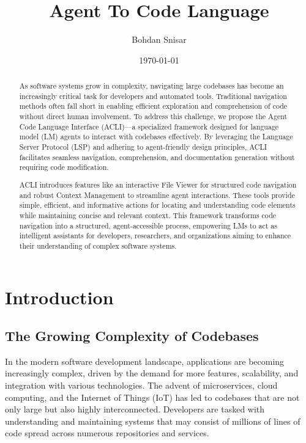 \documentclass[12pt,oneside]{article}
\date{\small\today}
\title{%
  Agent To Code Language \\
  \colorbox{mypink}{\small\sffamily\color{white}{White Paper}}}
\author{Bohdan Snisar} %
\begin{document}
\raggedbottom

\maketitle
\begin{abstract}
  As software systems grow in complexity, navigating large codebases has become an increasingly critical task for 
  developers and automated tools. Traditional navigation methods often fall short in enabling efficient exploration 
  and comprehension of code without direct human involvement. To address this challenge, we propose 
  the Agent Code Language Interface (ACLI)—a specialized framework designed for 
  language model (LM) agents to interact with codebases effectively. By leveraging the 
  Language Server Protocol (LSP) and adhering to agent-friendly design principles, ACLI facilitates seamless 
  navigation, comprehension, and documentation generation without requiring code modification.

  ACLI introduces features like an interactive File Viewer for structured code navigation and robust 
  Context Management to streamline agent interactions. These tools provide simple, efficient, and informative 
  actions for locating and understanding code elements while maintaining concise and relevant context. This framework 
  transforms code navigation into a structured, agent-accessible process, empowering LMs to act as intelligent assistants for 
  developers, researchers, and organizations aiming to enhance their understanding of complex software systems.
\end{abstract}


\section{Introduction}

\subsection{The Growing Complexity of Codebases}

In the modern software development landscape, applications are becoming increasingly complex, driven by the demand
for more features, scalability, and integration with various technologies. The advent of microservices, cloud computing, 
and the Internet of Things (IoT) has led to codebases that are not only large but also highly interconnected. Developers are 
tasked with understanding and maintaining systems that may consist of millions of lines of code spread across numerous repositories 
and services.
\end{document}
